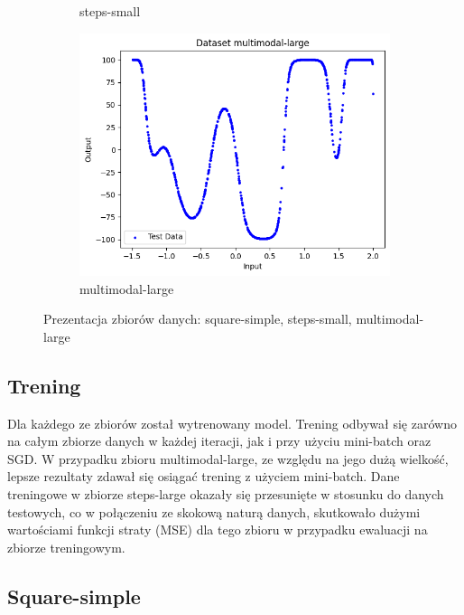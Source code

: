 \documentclass{article}
\begin{document}
\begin{figure}[H]
\begin{subfigure}[b]{0.3\textwidth}
        \caption{steps-small}
    \end{subfigure}
    \hfill
    \begin{subfigure}[b]{0.3\textwidth}
        \centering
        \includegraphics[width=\textwidth]{img/nn2/multimodal-large.png}
        \caption{multimodal-large}
    \end{subfigure}
    \caption{Prezentacja zbiorów danych: square-simple, steps-small, multimodal-large}
\end{figure}
\subsection*{Trening}
Dla każdego ze zbiorów został wytrenowany model. Trening odbywał się zarówno na całym zbiorze danych w każdej iteracji, jak i przy użyciu mini-batch oraz SGD. W przypadku zbioru multimodal-large, ze względu na jego dużą wielkość, lepsze rezultaty zdawał się osiągać trening z użyciem mini-batch. Dane treningowe w zbiorze steps-large okazały się przesunięte w stosunku do danych testowych, co w połączeniu ze skokową naturą danych, skutkowało dużymi wartościami funkcji straty (MSE) dla tego zbioru w przypadku ewaluacji na zbiorze treningowym.
\subsection*{Square-simple}
\end{document}
